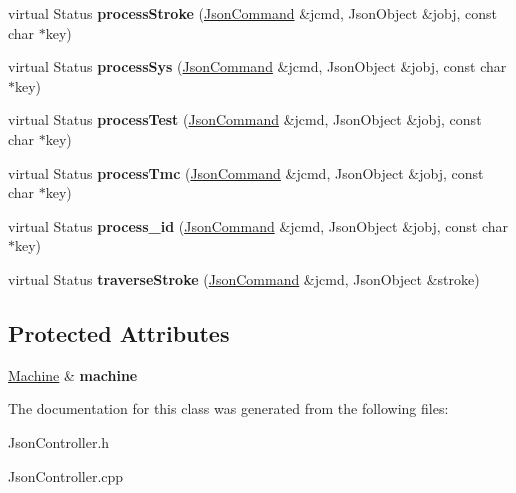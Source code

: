\begin{DoxyCompactItemize}
\item 
\hypertarget{classfirestep_1_1_json_controller_a4a696fb7b779e5223224224d99de1c51}{virtual Status {\bfseries process\+Stroke} (\hyperlink{classfirestep_1_1_json_command}{Json\+Command} \&jcmd, Json\+Object \&jobj, const char $\ast$key)}\label{classfirestep_1_1_json_controller_a4a696fb7b779e5223224224d99de1c51}

\item 
\hypertarget{classfirestep_1_1_json_controller_a37b35033be6e43d4681402fe5771a6cd}{virtual Status {\bfseries process\+Sys} (\hyperlink{classfirestep_1_1_json_command}{Json\+Command} \&jcmd, Json\+Object \&jobj, const char $\ast$key)}\label{classfirestep_1_1_json_controller_a37b35033be6e43d4681402fe5771a6cd}

\item 
\hypertarget{classfirestep_1_1_json_controller_a1dadb5a54b51ae0d6987a2c13eec3b1a}{virtual Status {\bfseries process\+Test} (\hyperlink{classfirestep_1_1_json_command}{Json\+Command} \&jcmd, Json\+Object \&jobj, const char $\ast$key)}\label{classfirestep_1_1_json_controller_a1dadb5a54b51ae0d6987a2c13eec3b1a}

\item 
\hypertarget{classfirestep_1_1_json_controller_a5719064f51231ec7352716e80154272c}{virtual Status {\bfseries process\+Tmc} (\hyperlink{classfirestep_1_1_json_command}{Json\+Command} \&jcmd, Json\+Object \&jobj, const char $\ast$key)}\label{classfirestep_1_1_json_controller_a5719064f51231ec7352716e80154272c}

\item 
\hypertarget{classfirestep_1_1_json_controller_a91863b815502ebe3a64c58272a995a33}{virtual Status {\bfseries process\+\_\+id} (\hyperlink{classfirestep_1_1_json_command}{Json\+Command} \&jcmd, Json\+Object \&jobj, const char $\ast$key)}\label{classfirestep_1_1_json_controller_a91863b815502ebe3a64c58272a995a33}

\item 
\hypertarget{classfirestep_1_1_json_controller_a563707aedbfe5720942326aa890cb342}{virtual Status {\bfseries traverse\+Stroke} (\hyperlink{classfirestep_1_1_json_command}{Json\+Command} \&jcmd, Json\+Object \&stroke)}\label{classfirestep_1_1_json_controller_a563707aedbfe5720942326aa890cb342}

\end{DoxyCompactItemize}
\subsection*{Protected Attributes}
\begin{DoxyCompactItemize}
\item 
\hypertarget{classfirestep_1_1_json_controller_aba224062a07e57d7afaaca88f4f48370}{\hyperlink{classfirestep_1_1_machine}{Machine} \& {\bfseries machine}}\label{classfirestep_1_1_json_controller_aba224062a07e57d7afaaca88f4f48370}

\end{DoxyCompactItemize}


The documentation for this class was generated from the following files\+:\begin{DoxyCompactItemize}
\item 
Json\+Controller.\+h\item 
Json\+Controller.\+cpp\end{DoxyCompactItemize}
